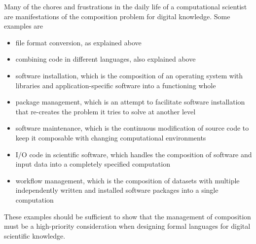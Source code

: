 Many of the chores and frustrations in the daily life of a computational scientist are manifestations of the composition problem for digital knowledge. Some examples are

\begin{itemize}
\item file format conversion, as explained above
\item combining code in different languages, also explained above
\item software installation, which is the composition of an operating system with libraries and application-specific software into a functioning whole
\item package management, which is an attempt to facilitate software installation that re-creates the problem it tries to solve at another level
\item software maintenance, which is the continuous modification of source code to keep it composable with changing computational environments
\item I/O code in scientific software, which handles the composition of software and input data into a completely specified computation
\item workflow management, which is the composition of datasets with multiple independently written and installed software packages into a single computation
\end{itemize}

These examples should be sufficient to show that the management of composition must be a high-priority consideration when designing formal languages for digital scientific knowledge.
